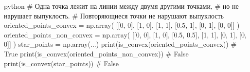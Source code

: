 \begin{mintedbox}{python}
# Одна точка лежит на линии между двумя другими точками,
# но не нарушает выпуклость.
# Повторяющиеся точки не нарушают выпуклость
oriented_points_convex = np.array(
	[[0, 0], [1, 0], [1, 1], [0.5, 1], [0, 1], [0, 0]]
	)
oriented_points_non_convex = np.array(
	[[0, 0], [1, 0], [0.5, 0.5], [1, 1], [0, 1], [0, 0]]
	)
star_points = np.array(...)
print(is_convex(oriented_points_convex))  # True
print(is_convex(oriented_points_non_convex))  # False
print(is_convex(star_points))  # False
\end{mintedbox}
